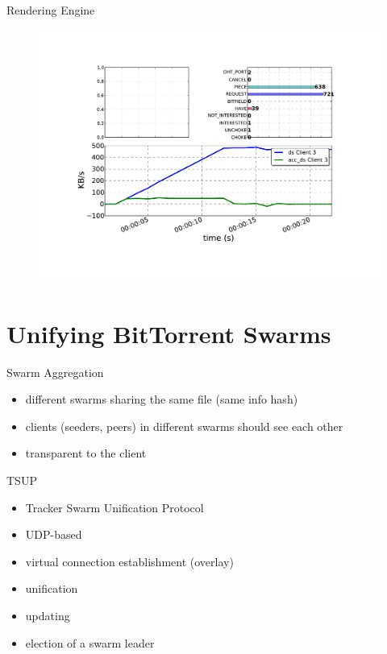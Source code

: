\documentclass{beamer}
\begin{document}
\begin{frame}{Rendering Engine}
  \begin{figure}
    \includegraphics[scale=0.3]{img/test3}
  \end{figure}
\end{frame}

\section{Unifying BitTorrent Swarms}

\begin{frame}{Swarm Aggregation}
  \begin{itemize}
    \item different swarms sharing the same file (same info hash)
    \item clients (seeders, peers) in different swarms should see each other
    \item transparent to the client
  \end{itemize}
\end{frame}

\begin{frame}{TSUP}
  \begin{itemize}
    \item Tracker Swarm Unification Protocol
    \item UDP-based
    \item virtual connection establishment (overlay)
    \item unification
    \item updating
    \item election of a swarm leader
  \end{itemize}
\end{frame}
\end{document}
